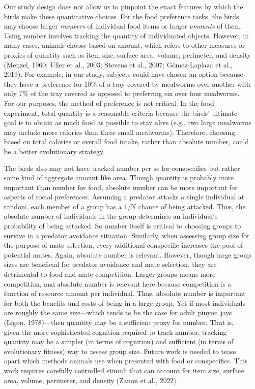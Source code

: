 \documentclass[
  ,pub,floatsintext]{apa6}
\begin{document}
Our study design does not allow us to pinpoint the exact features by which the birds make these quantitative choices. For the food preference tasks, the birds may choose larger \emph{numbers} of individual food items or larger \emph{amounts} of them. Using number involves tracking the quantity of individuated objects. However, in many cases, animals choose based on amount, which refers to other measures or proxies of quantity such as item size, surface area, volume, perimeter, and density (Menzel, 1960; Uller et al., 2003; Stevens et al., 2007; Gómez-Laplaza et al., 2019). For example, in our study, subjects could have chosen an option because they have a preference for 10\% of a tray covered by mealworms over another with only 7\% of the tray covered as opposed to preferring six over four mealworms. For our purposes, the method of preference is not critical. In the food experiment, total quantity is a reasonable criteria because the birds' ultimate goal is to obtain as much food as possible to stay alive (e.g., two large mealworms may include more calories than three small mealworms). Therefore, choosing based on total calories or overall food intake, rather than absolute number, could be a better evolutionary strategy.

The birds also may not have tracked number per se for conspecifics but rather some kind of aggregate amount like area. Though quantity is probably more important than number for food, absolute number can be more important for aspects of social preferences. Assuming a predator attacks a single individual at random, each member of a group has a 1/N chance of being attacked. Thus, the absolute number of individuals in the group determines an individual's probability of being attacked. So number itself is critical to choosing groups to survive in a predator avoidance situation. Similarly, when assessing group size for the purpose of mate selection, every additional conspecific increases the pool of potential mates. Again, absolute number is relevant. However, though large group sizes are beneficial for predator avoidance and mate selection, they are detrimental to food and mate competition. Larger groups means more competition, and absolute number is relevant here because competition is a function of resource amount per individual. Thus, absolute number is important for both the benefits and costs of being in a large group. Yet if most individuals are roughly the same size---which tends to be the case for adult pinyon jays (Ligon, 1978)---then quantity may be a sufficient proxy for number. That is, given the more sophisticated cognition required to track number, tracking quantity may be a simpler (in terms of cognition) and sufficient (in terms of evolutionary fitness) way to assess group size. Future work is needed to tease apart which methods animals use when presented with food or conspecifics. This work requires carefully controlled stimuli that can account for item size, surface area, volume, perimeter, and density (Zanon et al., 2022).
\end{document}
